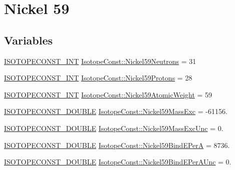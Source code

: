 \hypertarget{group___isotope_const-_nickel-_ni59}{}\section{Nickel 59}
\label{group___isotope_const-_nickel-_ni59}
\subsection*{Variables}
\begin{DoxyCompactItemize}
\item 
\mbox{\hyperlink{group___isotope_const-_macros_ga5f18360b3e99483a35c32d789e62621c}{I\+S\+O\+T\+O\+P\+E\+C\+O\+N\+S\+T\+\_\+\+I\+NT}} \mbox{\hyperlink{group___isotope_const-_nickel-_ni59_ga008e3f7cccdd9f53f6674405635b8083}{Isotope\+Const\+::\+Nickel59\+Neutrons}} = 31
\item 
\mbox{\hyperlink{group___isotope_const-_macros_ga5f18360b3e99483a35c32d789e62621c}{I\+S\+O\+T\+O\+P\+E\+C\+O\+N\+S\+T\+\_\+\+I\+NT}} \mbox{\hyperlink{group___isotope_const-_nickel-_ni59_gad15816b38057118835d6504b3308edea}{Isotope\+Const\+::\+Nickel59\+Protons}} = 28
\item 
\mbox{\hyperlink{group___isotope_const-_macros_ga5f18360b3e99483a35c32d789e62621c}{I\+S\+O\+T\+O\+P\+E\+C\+O\+N\+S\+T\+\_\+\+I\+NT}} \mbox{\hyperlink{group___isotope_const-_nickel-_ni59_gaa70b774e081237d9ca7754294cf6815d}{Isotope\+Const\+::\+Nickel59\+Atomic\+Weight}} = 59
\item 
\mbox{\hyperlink{group___isotope_const-_macros_ga8f45a7272ce02c0b4c65c44636ed719a}{I\+S\+O\+T\+O\+P\+E\+C\+O\+N\+S\+T\+\_\+\+D\+O\+U\+B\+LE}} \mbox{\hyperlink{group___isotope_const-_nickel-_ni59_gacb7b4faa302c3adc7ad8dcfc670c4c80}{Isotope\+Const\+::\+Nickel59\+Mass\+Exc}} = -\/61156.
\item 
\mbox{\hyperlink{group___isotope_const-_macros_ga8f45a7272ce02c0b4c65c44636ed719a}{I\+S\+O\+T\+O\+P\+E\+C\+O\+N\+S\+T\+\_\+\+D\+O\+U\+B\+LE}} \mbox{\hyperlink{group___isotope_const-_nickel-_ni59_ga8f1f6db53e290ffce4b72a4e1317e14c}{Isotope\+Const\+::\+Nickel59\+Mass\+Exc\+Unc}} = 0.
\item 
\mbox{\hyperlink{group___isotope_const-_macros_ga8f45a7272ce02c0b4c65c44636ed719a}{I\+S\+O\+T\+O\+P\+E\+C\+O\+N\+S\+T\+\_\+\+D\+O\+U\+B\+LE}} \mbox{\hyperlink{group___isotope_const-_nickel-_ni59_gacfb15ee563b441d842a14e4a42894982}{Isotope\+Const\+::\+Nickel59\+Bind\+E\+PerA}} = 8736.
\item 
\mbox{\hyperlink{group___isotope_const-_macros_ga8f45a7272ce02c0b4c65c44636ed719a}{I\+S\+O\+T\+O\+P\+E\+C\+O\+N\+S\+T\+\_\+\+D\+O\+U\+B\+LE}} \mbox{\hyperlink{group___isotope_const-_nickel-_ni59_gaca579e6881bc129c6cf511e9a33071ac}{Isotope\+Const\+::\+Nickel59\+Bind\+E\+Per\+A\+Unc}} = 0.

\end{DoxyCompactItemize}
